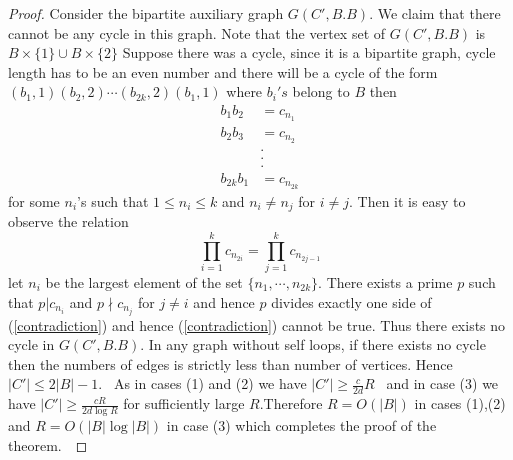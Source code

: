 \documentclass{amsart}
\newtheorem{Lemma 1}{Lemma}[section]
\newtheorem{Lemma 3}[Lemma 1]{Lemma}
\newtheorem{Lucas The}[Lemma 1]{Theorem}
\newtheorem{lem 1}[Lemma 1]{Lemma}
\newtheorem{Corollary 1}[Lemma 1]{Corollary}
\newtheorem{Corollary 2}[Lemma 1]{Corollary}
\begin{document}
\begin{proof}
		Consider the bipartite auxiliary graph $G(C',B.B)$. We claim that there cannot be any cycle in this graph. Note that the vertex set of $G(C',B.B)$ is $B\times\{1\}\cup B\times\{2\}$ Suppose there was a cycle, since it is a bipartite graph, cycle length has to be an even number and there will be a cycle of the form  $(b_1,1)(b_2,2)\cdots (b_{2k},2)(b_1,1)$ where $b_i's$ belong to $B$ then \begin{align*}  b_1b_2&=c_{n_1}\\  b_2b_3&=c_{n_2}\\        &.       \\        &.\\        &.\\  b_{2k}b_1&=c_{n_{2k}}    \end{align*}for some $n_i$'s such that $1\leq n_i\leq k$ and $n_i\neq n_j$ for $i\neq j$. Then it is easy to observe the relation \begin{equation}\label{contradiction}\prod_{i=1}^{k}c_{n_{2i}}=\prod_{j=1}^{k}c_{n_{2j-1}}\end{equation}let $n_i$ be the largest element of the set $\{n_1, \cdots,n_{2k}\}$. There exists a prime $p$ such that $p|c_{n_i}$ and $p\nmid c_{n_j}$ for $j\neq i$ and hence $p$ divides exactly one side of (\ref{contradiction}) and hence (\ref{contradiction}) cannot be true. Thus there exists no cycle in $G(C',B.B)$. In any graph without self loops, if there exists no cycle then the numbers of edges is strictly less than number of vertices. Hence $|C'|\leq 2|B|-1$.  As in cases (1) and (2) we have $|C'|\geq \frac{c}{2d}R$  and in case (3) we have $|C'|\geq \frac{cR}{2d\log R}$ for sufficiently large $R$.Therefore $R=O(|B|)$ in cases (1),(2) and $R=O(|B|\log |B|)$ in case (3) which completes the proof of the theorem. \end{proof}
\end{document}
